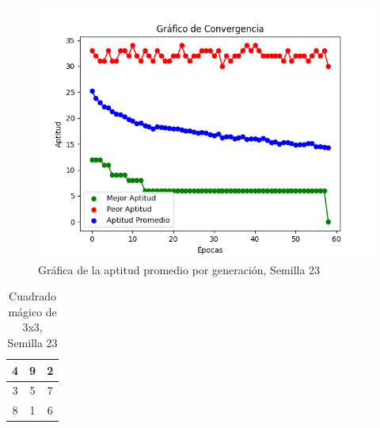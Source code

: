 \documentclass{report}
\begin{document}
    \begin{figure}[H]
        \centering
        \includegraphics[scale=0.5]{Grafica8.png}
        \caption{Gráfica de la aptitud promedio por generación, Semilla 23}
    \end{figure}
    \begin{table}[H]
        \centering
        \begin{tabular}{|c|c|c|}
            \hline
            4 & 9 & 2\\
            \hline
            3 & 5 & 7\\
            \hline
            8 & 1 & 6\\
            \hline
        \end{tabular}
        \caption{Cuadrado mágico de 3x3, Semilla 23}
    \end{table}
\end{document}
